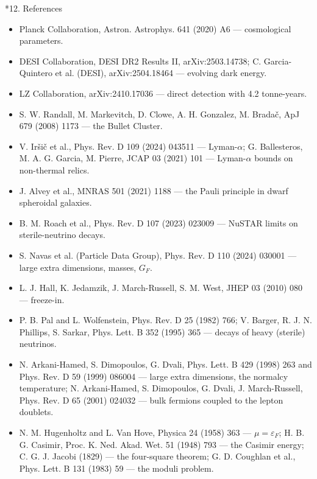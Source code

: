 \documentclass[10pt,a4paper]{article}
\makeatletter
\renewcommand\section{\@startsection{section}{1}{\z@}{-3.5ex \@plus -1ex \@minus -.2ex}{2.3ex \@plus.2ex}{\normalfont\Large\bfseries\raggedright}}
\makeatother
\begin{document}
\section*{12. References}
\begin{itemize}
\item Planck Collaboration, Astron. Astrophys. 641 (2020) A6 — cosmological parameters.
\item DESI Collaboration, DESI DR2 Results II, arXiv:2503.14738; C. Garcia-Quintero et al. (DESI), arXiv:2504.18464 — evolving dark energy.
\item LZ Collaboration, arXiv:2410.17036 — direct detection with 4.2 tonne-years.
\item S. W. Randall, M. Markevitch, D. Clowe, A. H. Gonzalez, M. Bradač, ApJ 679 (2008) 1173 — the Bullet Cluster.
\item V. Iršič et al., Phys. Rev. D 109 (2024) 043511 — Lyman-$\alpha$; G. Ballesteros, M. A. G. Garcia, M. Pierre, JCAP 03 (2021) 101 — Lyman-$\alpha$ bounds on non-thermal relics.
\item J. Alvey et al., MNRAS 501 (2021) 1188 — the Pauli principle in dwarf spheroidal galaxies.
\item B. M. Roach et al., Phys. Rev. D 107 (2023) 023009 — NuSTAR limits on sterile-neutrino decays.
\item S. Navas et al. (Particle Data Group), Phys. Rev. D 110 (2024) 030001 — large extra dimensions, masses, $G_F$.
\item L. J. Hall, K. Jedamzik, J. March-Russell, S. M. West, JHEP 03 (2010) 080 — freeze-in.
\item P. B. Pal and L. Wolfenstein, Phys. Rev. D 25 (1982) 766; V. Barger, R. J. N. Phillips, S. Sarkar, Phys. Lett. B 352 (1995) 365 — decays of heavy (sterile) neutrinos.
\item N. Arkani-Hamed, S. Dimopoulos, G. Dvali, Phys. Lett. B 429 (1998) 263 and Phys. Rev. D 59 (1999) 086004 — large extra dimensions, the normalcy temperature; N. Arkani-Hamed, S. Dimopoulos, G. Dvali, J. March-Russell, Phys. Rev. D 65 (2001) 024032 — bulk fermions coupled to the lepton doublets.
\item N. M. Hugenholtz and L. Van Hove, Physica 24 (1958) 363 — $\mu=\varepsilon_F$; H. B. G. Casimir, Proc. K. Ned. Akad. Wet. 51 (1948) 793 — the Casimir energy; C. G. J. Jacobi (1829) — the four-square theorem; G. D. Coughlan et al., Phys. Lett. B 131 (1983) 59 — the moduli problem.
\end{itemize}
\end{document}
